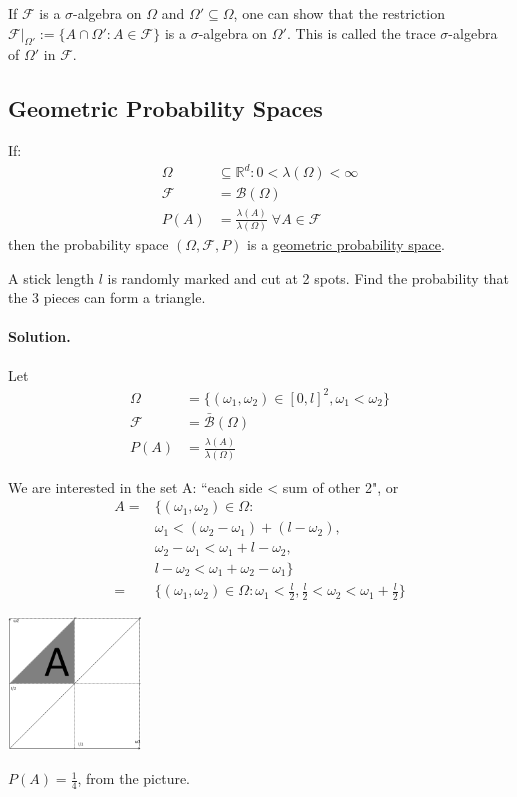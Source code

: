 \documentclass{article}
\begin{document}
	If $\mathcal{F}$ is a $\sigma$-algebra on $\Omega$ and $\Omega'\subseteq\Omega$, one can show that the restriction\\
	$\mathcal{F}|_{\Omega'}:=\{A\cap\Omega' : A\in\mathcal{F}\}$ is a $\sigma$-algebra on $\Omega'$. This is called the trace $\sigma$-algebra of $\Omega'$ in $\mathcal{F}$.
	
	\newpage\subsection{Geometric Probability Spaces}
	\begin{mydef}{}{}
		If:
		\begin{align*}
			\Omega&\subseteq\mathbb{R}^d : 0<\lambda(\Omega)<\infty\\
			\mathcal{F}&=\mathcal{B}(\Omega) \\
			P(A)&=\frac{\lambda(A)}{\lambda(\Omega)}\;\forall A\in\mathcal{F}
		\end{align*}
		then the probability space $(\Omega, \mathcal{F}, P)$ is a \underline{geometric probability space}.
	\end{mydef}
	
	\begin{myex}{}{}
		A stick length $l$ is randomly marked and cut at 2 spots. Find the probability that the 3 pieces can form a triangle.
		
		\paragraph{Solution.}
		Let
		\begin{align*}
			\Omega&=\{(\omega_1, \omega_2)\in[0, l]^2, \omega_1<\omega_2\}\\
			\mathcal{F}&=\bar{\mathcal{B}}(\Omega)\\
			P(A)&=\frac{\lambda(A)}{\lambda(\Omega)}
		\end{align*}
		
		We are interested in the set A: ``each side \textless\; sum of other 2", or
		\begin{align*}
			A=&\{(\omega_1, \omega_2)\in\Omega :\\
			&\omega_1<(\omega_2-\omega_1)+(l-\omega_2),\\
			&\omega_2-\omega_1<\omega_1+l-\omega_2,\\
			&l-\omega_2<\omega_1+\omega_2-\omega_1\}\\
			=&\{(\omega_1, \omega_2)\in\Omega : \omega_1<\frac{l}{2}, \frac{l}{2}<\omega_2<\omega_1+\frac{l}{2}\}
		\end{align*}
		
		\includegraphics[width=100pt]{triangle.png}
		
		$P(A)=\frac{1}{4}$, from the picture.
	\end{myex}
	
\end{document}
